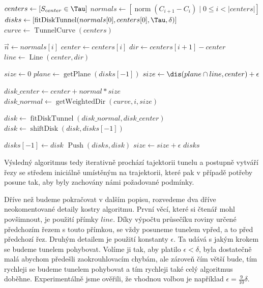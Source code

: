 \begin{algorithmic}[1]
\label{alg:digTunnel}

    \State $ centers \gets [ S_{center} \in \Tau ] $
    \State $ normals \gets [ \operatorname{norm}(C_{i + 1} - C_{i}) \mid 0 \leq i < |centers| ] $
    \State $ disks \gets   [ \operatorname{fitDiskTunnel}(normals[0], centers[0], \Tau, \delta)] $
    \State $ curve \gets \operatorname{TunnelCurve}(centers) $
    \Statex

            \Break
        \EndIf
        \State $ \vec{n} \gets normals[i] $
        \State $ center \gets centers[i] $
        \State $ dir \gets centers[i + 1] - center $
        \State $ line \gets \operatorname{Line}(center, dir) $
        \Statex

        \State $ size \gets 0 $
                \State $ plane \gets \operatorname{getPlane}(disks[-1]) $
                \State $ size \gets \dis(plane \cap line, center) + \epsilon $
            \EndIf
            \Statex

            \State $ disk\_center \gets center + normal * size $
            \State $ disk\_normal \gets \operatorname{getWeightedDir}(curve, i, size) $

            \State $ disk \gets \operatorname{fitDiskTunnel}(disk\_normal, disk\_center) $ \label{alg:fit_disk}
            \State $ disk \gets \operatorname{shiftDisk}(disk, disks[-1]) $ \label{alg:shift_disk}
            \Statex

                \State $ disks[-1] \gets disk $
            \Else
                \State $ \operatorname{Push}(disks, disk) $
            \EndIf
            \State $ size \gets size + \epsilon $
        \EndWhile
    \EndFor
    \State \Return $ disks $
\EndFunction

\end{algorithmic}

Výsledný algoritmus tedy iterativně prochází tajektorii tunelu a postupně vytváří řezy
se středem iniciálně umístěným na trajektorii, které pak v případě potřeby posune tak,
aby byly zachovány námi požadované podmínky.

Dříve než budeme pokračovat v dalším popisu, rozvedeme dva dříve neokomentované
detaily kostry algoritmu. První věcí, které si čtenář mohl povšimnout, je použití přímky
$ line $. Díky výpočtu průsečíku roviny určené předchozím řezem s touto přímkou, se
vždy posuneme tunelem vpřed, a to před předchozí řez. Druhým detailem je použití
konstanty $ \epsilon $. Ta udává s jakým krokem se budeme tunelem pohybovat.
Volíme ji tak, aby platilo  $ \epsilon < \delta $, byla dostatečně malá abychom
předešli zaokrouhlovacím chybám, ale zároveň čím větší bude, tím rychleji se
budeme tunelem pohybovat a tím rychleji také celý algoritmus doběhne. Experimentálně
jsme ověřili, že vhodnou volbou je například $ \epsilon = \frac{9}{10} \delta $.


